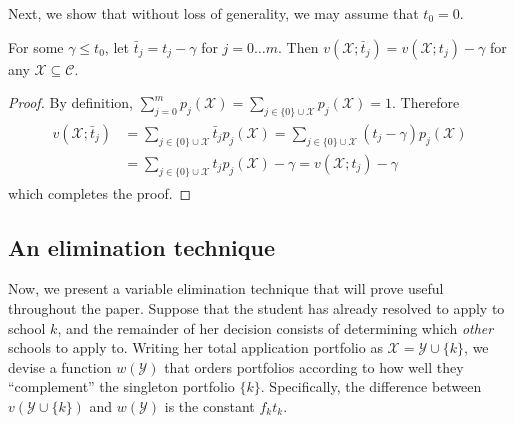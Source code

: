 Next, we show that without loss of generality, we may assume that $t_0 = 0$.

\begin{lemma} \label{assumetzerozero}
For some $\gamma \leq t_0$, let $\bar t_j = t_j - \gamma$ for $j = 0 \dots m$. Then $v(\mathcal{X}; \bar t_j) = v(\mathcal{X};  t_j) -  \gamma$ for any $\mathcal{X} \subseteq \mathcal{C}$. 
\end{lemma}
\begin{proof}
By definition, $\sum_{j=0}^m p_j(\mathcal{X}) = \sum_{j \in \{0\}\cup\mathcal{X}} p_j(\mathcal{X}) = 1$. Therefore
\begin{align*}
\begin{split}
v(\mathcal{X}; \bar t_j) &= \sum_{j\in \{0\}\cup\mathcal{X}}  \bar t_j p_j(\mathcal{X})
=\sum_{j\in \{0\}\cup\mathcal{X}} (t_j - \gamma) p_j(\mathcal{X}) \\
&=\sum_{j\in \{0\}\cup\mathcal{X}} t_j p_j(\mathcal{X})  - \gamma 
= v(\mathcal{X}; t_j) - \gamma
\end{split} 
\end{align*}
which completes the proof.
\end{proof}


\subsection{An elimination technique} \label{eliminationtechniquesection}

Now, we present a variable elimination technique that will prove useful throughout the paper. Suppose that the student has already resolved to apply to school $k$, and the remainder of her decision consists of determining which \emph{other} schools to apply to. Writing her total application portfolio as $\mathcal{X} = \mathcal{Y} \cup \{k\}$, we devise a function $w(\mathcal{Y})$ that orders portfolios according to how well they ``complement'' the singleton portfolio $\{k\}$. Specifically, the difference between $v(\mathcal{Y} \cup\{k\})$ and $w(\mathcal{Y})$ is the constant $f_k t_k$.

